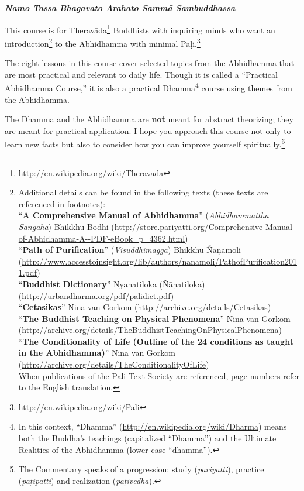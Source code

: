 \begin{center}
\textbf{\textit{Namo Tassa Bhagavato Arahato Sammā Sambuddhassa}} \\
\end{center}

This course is for Theravāda\footnote{\url{http://en.wikipedia.org/wiki/Theravada}} Buddhists with inquiring minds who want an introduction\footnote{Additional details can be found in the following texts (these texts are referenced in footnotes):\\
“\textbf{A Comprehensive Manual of Abhidhamma}” (\textit{Abhidhammattha Sangaha}) Bhikkhu Bodhi (\url{http://store.pariyatti.org/Comprehensive-Manual-of-Abhidhamma-A--PDF-eBook_p_4362.html})\\
“\textbf{Path of Purification}” (\textit{Visuddhimagga}) Bhikkhu Ñāṇamoli (\url{http://www.accesstoinsight.org/lib/authors/nanamoli/PathofPurification2011.pdf})\\
“\textbf{Buddhist Dictionary}” Nyanatiloka (Ñāṇatiloka) (\url{http://urbandharma.org/pdf/palidict.pdf})\\
“\textbf{Cetasikas}” Nina van Gorkom (\url{http://archive.org/details/Cetasikas})\\
“\textbf{The Buddhist Teaching on Physical Phenomena}” Nina van Gorkom (\url{http://archive.org/details/TheBuddhistTeachingOnPhysicalPhenomena})\\
“\textbf{The Conditionality of Life (Outline of the 24 conditions as taught in the Abhidhamma)}” Nina van Gorkom (\url{http://archive.org/details/TheConditionalityOfLife})\\
When publications of the Pali Text Society are referenced, page numbers refer to the English translation.} to the Abhidhamma with minimal Pāḷi.\footnote{\url{http://en.wikipedia.org/wiki/Pali}} 

The eight lessons in this course cover selected topics from the Abhidhamma that are most practical and relevant to daily life. Though it is called a “Practical Abhidhamma Course,” it is also a practical Dhamma\footnote{In this context, “Dhamma” (\url{http://en.wikipedia.org/wiki/Dharma}) means both the Buddha’s teachings (capitalized “Dhamma”) and the Ultimate Realities of the Abhidhamma (lower case “dhamma”).} course using themes from the Abhidhamma.

The Dhamma and the Abhidhamma are \textbf{not} meant for abstract theorizing; they are meant for practical application. I hope you approach this course not only to learn new facts but also to consider how you can improve yourself spiritually.\footnote{The Commentary speaks of a progression: study (\textit{pariyatti}), practice (\textit{paṭipatti}) and realization (\textit{paṭivedha}).}


